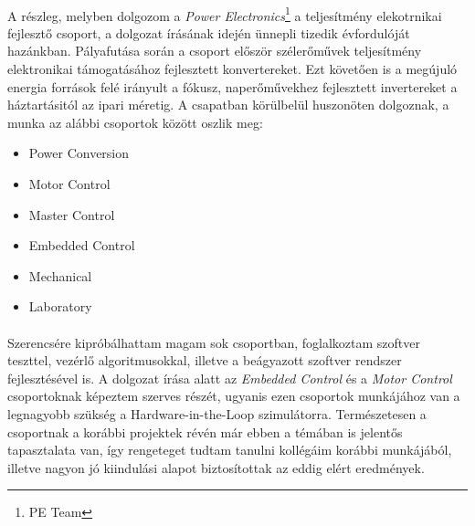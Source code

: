 \paragraph{}
A részleg, melyben dolgozom a \emph{Power Electronics}\footnote{PE Team} a teljesítmény elekotrnikai fejlesztő csoport, a dolgozat írásának idején ünnepli tizedik évfordulóját hazánkban. Pályafutása során a csoport először szélerőművek teljesítmény elektronikai támogatásához fejlesztett konvertereket. Ezt követően is a megújuló energia források felé irányult a fókusz, naperőművekhez fejlesztett invertereket a háztartásitól az ipari méretig. A csapatban körülbelül huszonöten dolgoznak, a munka az alábbi csoportok között oszlik meg:

\begin{itemize}
	\item{Power Conversion}
	\item{Motor Control}
	\item{Master Control}
	\item{Embedded Control}
	\item{Mechanical}
	\item{Laboratory} 
\end{itemize}

\paragraph{}
Szerencsére kipróbálhattam magam sok csoportban, foglalkoztam szoftver teszttel, vezérlő algoritmusokkal, illetve a beágyazott szoftver rendszer fejlesztésével is. A dolgozat írása alatt az \emph{Embedded Control} és a \emph{Motor Control} csoportoknak képeztem szerves részét, ugyanis ezen csoportok munkájához van a legnagyobb szükség a Hardware-in-the-Loop szimulátorra. Természetesen a csoportnak a korábbi projektek révén már ebben a témában is jelentős tapasztalata van, így rengeteget tudtam tanulni kollégáim korábbi munkájából, illetve nagyon jó kiindulási alapot biztosítottak az eddig elért eredmények.




